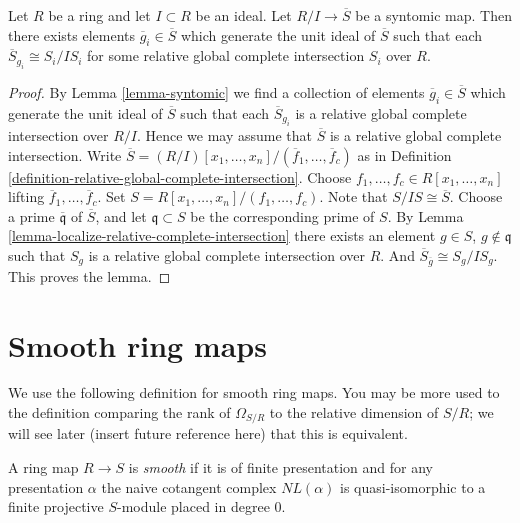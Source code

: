 \begin{lemma}
\label{lemma-lift-syntomic}
Let $R$ be a ring and let $I \subset R$ be an ideal.
Let $R/I \to \overline{S}$ be a syntomic map.
Then there exists elements $\overline{g}_i \in \overline{S}$
which generate the unit ideal of $\overline{S}$
such that each $\overline{S}_{g_i} \cong S_i/IS_i$
for some relative global complete intersection $S_i$
over $R$.
\end{lemma}

\begin{proof}
By Lemma \ref{lemma-syntomic} we find a collection of elements
$\overline{g}_i \in \overline{S}$
which generate the unit ideal of $\overline{S}$
such that each $\overline{S}_{g_i}$ is a relative
global complete intersection over $R/I$.
Hence we may assume that $\overline{S}$ is a
relative global complete intersection.
Write
$\overline{S} =
(R/I)[x_1, \ldots, x_n]/(\overline{f}_1, \ldots, \overline{f}_c)$
as in Definition \ref{definition-relative-global-complete-intersection}.
Choose $f_1, \ldots, f_c \in R[x_1, \ldots, x_n]$
lifting $\overline{f}_1, \ldots, \overline{f}_c$.
Set $S = R[x_1, \ldots, x_n]/(f_1, \ldots, f_c)$.
Note that $S/IS \cong \overline{S}$.
Choose a prime $\overline{\mathfrak q}$ of $\overline{S}$,
and let $\mathfrak q \subset S$ be the corresponding prime of $S$.
By Lemma \ref{lemma-localize-relative-complete-intersection}
there exists an element $g \in S$, $g \not\in \mathfrak q$
such that $S_g$ is a relative global complete intersection over $R$.
And $\overline{S}_{\overline{g}} \cong S_g/IS_g$. This
proves the lemma.
\end{proof}


\section{Smooth ring maps}
\label{section-smooth}

\noindent
We use the following definition for smooth ring maps.
You may be more used to the definition comparing the
rank of $\Omega_{S/R}$ to the relative dimension of $S/R$;
we will see later (insert future reference here) that this
is equivalent.

\begin{definition}
\label{definition-smooth}
A ring map $R \to S$ is {\it smooth} if it is of finite presentation
and for any presentation $\alpha$ the naive cotangent complex $NL(\alpha)$
is quasi-isomorphic to a finite projective $S$-module placed in degree $0$.
\end{definition}


